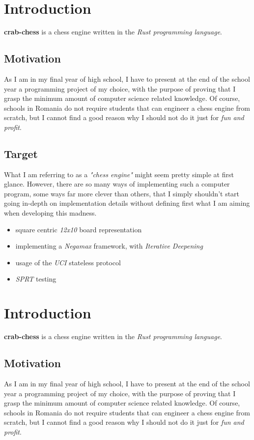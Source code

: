 
\section{Introduction}

\textbf{crab-chess} is a chess engine written in the \textit{Rust programming language}.

\subsection{Motivation}
As I am in my final year of high school, I have to present at the end of the school year a programming project of my choice, with the purpose of proving that I grasp the minimum amount of computer science related knowledge. Of course, schools in Romania do not require students that can engineer a chess engine from scratch, but I cannot find a good reason why I should not do it just for \textit{fun and profit}.

\subsection{Target}
What I am referring to as a \textit{"chess engine"} might seem pretty simple at first glance. However, there are so many ways of implementing such a computer program, some ways far more clever than others, that I simply shouldn't start going in-depth on implementation details without defining first what I am aiming when developing this madness.

\begin{itemize}
    \item square centric \textit{12x10} board representation
    \item implementing a \textit{Negamax} framework, with \textit{Iterative Deepening}
    \item usage of the \textit{UCI} stateless protocol
    \item \textit{SPRT} testing
\end{itemize}

\section{Introduction}

\textbf{crab-chess} is a chess engine written in the \textit{Rust programming language}.

\subsection{Motivation}
As I am in my final year of high school, I have to present at the end of the school year a programming project of my choice, with the purpose of proving that I grasp the minimum amount of computer science related knowledge. Of course, schools in Romania do not require students that can engineer a chess engine from scratch, but I cannot find a good reason why I should not do it just for \textit{fun and profit}.

